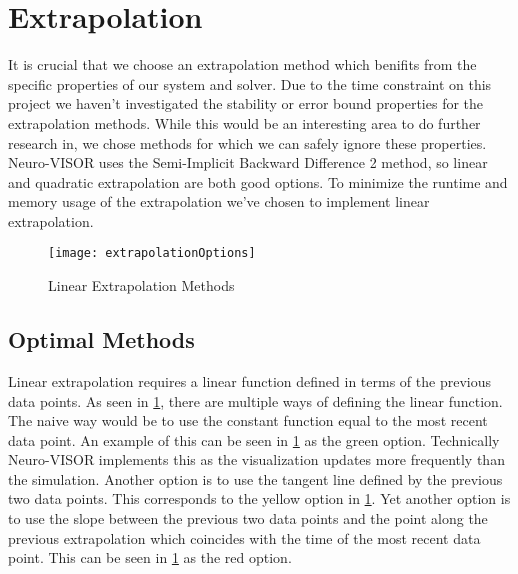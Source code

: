 
\section{Extrapolation}%
\label{sec:extrapolation}

It is crucial that we choose an extrapolation method which benifits from the specific properties of our system and solver.
Due to the time constraint on this project we haven't investigated the stability or error bound properties for the extrapolation methods.
While this would be an interesting area to do further research in, we chose methods for which we can safely ignore these properties.
Neuro-VISOR uses the Semi-Implicit Backward Difference 2 method\cite{neuroVISOR}, so linear and quadratic extrapolation are both good options.
To minimize the runtime and memory usage of the extrapolation we've chosen to implement linear extrapolation.

\begin{figure}[H]
    \centering
    \texttt{[image: extrapolationOptions]}
    \caption{Linear Extrapolation Methods}%
    \label{fig:extrapMethods}
\end{figure}

\subsection{Optimal Methods}%
\label{sub:optimal_methods}

Linear extrapolation requires a linear function defined in terms of the previous data points.
As seen in \cref{fig:extrapMethods}, there are multiple ways of defining the linear function.
The naive way would be to use the constant function equal to the most recent data point.
An example of this can be seen in \cref{fig:extrapMethods} as the green option.
Technically Neuro-VISOR implements this as the visualization updates more frequently than the simulation.
Another option is to use the tangent line defined by the previous two data points.
This corresponds to the yellow option in \cref{fig:extrapMethods}.
Yet another option is to use the slope between the previous two data points and the point along the previous extrapolation which coincides with the time of the most recent data point.
This can be seen in \cref{fig:extrapMethods} as the red option.

